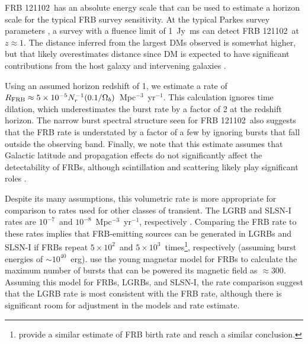 \documentclass[twocolumn]{aastex61}
\newcommand{\frb}{FRB 121102}
\begin{document}
\frb\ has an absolute energy scale that can be used to estimate a horizon scale for the typical FRB survey sensitivity. At the typical Parkes survey parameters \citep[e.g.,][]{2016MNRAS.460L..30C}, a survey with a fluence limit of 1~Jy~ms can detect \frb\ at $z\approx1$. The distance inferred from the largest DMs observed \citep[$\sim1500$\ pc cm$^{-3}$;][]{2016MNRAS.460L..30C} is somewhat higher, but that likely overestimates distance since DM is expected to have significant contributions from the host galaxy and intervening galaxies \citep{OPT, 2014ApJ...780L..33M}.

Using an assumed horizon redshift of 1, we estimate a rate of $R_{\rm{FRB}} \approx 5\times10^{-5} N_r^{-1} (0.1/\Omega_b)$\ Mpc$^{-3}$\ yr$^{-1}$. This calculation ignores time dilation, which underestimates the burst rate by a factor of 2 at the redshift horizon. The narrow burst spectral structure seen for \frb\ also suggests that the FRB rate is understated by a factor of a few by ignoring bursts that fall outside the observing band. Finally, we note that this estimate assumes that Galactic latitude and propagation effects do not significantly affect the detectability of FRBs, although scintillation and scattering likely play significant roles \citep{2015MNRAS.451.3278M, 2017arXiv170306580C}.

Despite its many assumptions, this volumetric rate is more appropriate for comparison to rates used for other classes of transient. The LGRB and SLSN-I rates are $10^{-7}$\ and $10^{-8}$\ Mpc$^{-3}$\ yr$^{-1}$, respectively \citep{2007ApJ...657L..73G,2012Sci...337..927G}. Comparing the FRB rate to these rates implies that FRB-emitting sources can be generated in LGRBs and SLSN-I if FRBs repeat $5\times10^2$\ and $5\times10^3$\ times\footnote{\citet{2017arXiv170400022N} provide a similar estimate of FRB birth rate and reach a similar conclusion.}, respectively (assuming burst energies of $\sim10^{40}$\ erg). \citet{2017arXiv170102370M} use the young magnetar model for FRBs to calculate the maximum number of bursts that can be powered its magnetic field as $\approx300$. Assuming this model for FRBs, LGRBs, and SLSN-I, the rate comparison suggest that the LGRB rate is most consistent with the FRB rate, although there is significant room for adjustment in the models and rate estimate.

\end{document}
